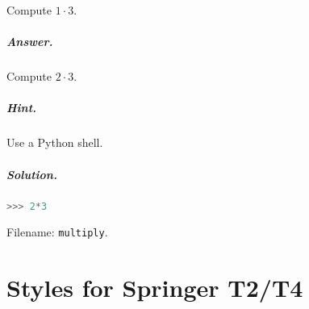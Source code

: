 \documentclass[graybox,sectrefs,envcountresetchap,open=right,final]{svmonodo}
\makeatletter
\newenvironment{doconceexercise}{}{}
\newcounter{doconceexercisecounter}%
\newcommand\listofexercises{
\chapter*{List of Problems
          \@mkboth{List of Problems}{List of Problems}}
\markboth{List of Problems}{List of Problems}
\@starttoc{loe}
}
\makeatother
\begin{document}
\begin{doconceexercise}

                
\label{exer:mul}

Compute $1\cdot 3$.

\paragraph{Answer.}



Compute $2\cdot 3$.


\paragraph{Hint.}
Use a Python shell.


\paragraph{Solution.}



\begin{lstlisting}[language=python,style=simple,xleftmargin=2mm]
>>> 2*3


\end{lstlisting}



\noindent Filename: \texttt{multiply}.

\end{doconceexercise}



\appendix

\chapter{Styles for Springer T2/T4}
\end{document}

